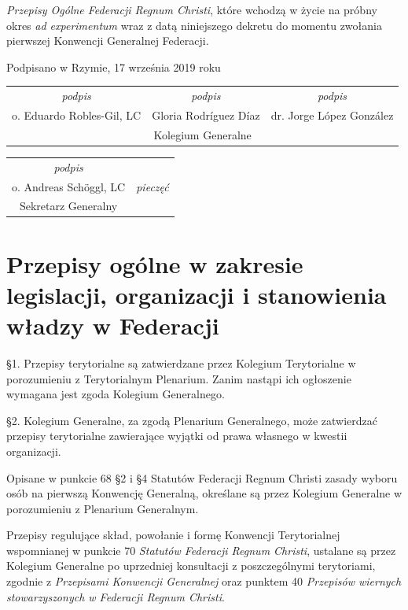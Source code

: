 \begin{framed}
\begin{footnotesize}
		{\em Przepisy Ogólne Federacji Regnum Christi}, które wchodzą w życie na próbny okres {\em ad experimentum} wraz z datą niniejszego dekretu do momentu zwołania pierwszej Konwencji Generalnej Federacji.
		\begin{center}
			Podpisano w Rzymie, 17 września 2019 roku
			\begin{tabular}
				{ c c c } {\em podpis} & {\em podpis} & {\em podpis} \\
				o. Eduardo Robles-Gil, LC & Gloria Rodríguez Díaz & dr. Jorge López González \\
				\multicolumn{3}{c}{Kolegium Generalne} 
			\end{tabular}
			\begin{tabular}
				{ c c } {\em podpis} & \\
				o. Andreas Schöggl, LC & {\em pieczęć} \\
				Sekretarz Generalny & 
			\end{tabular}
		\end{center}
	\end{footnotesize}
\end{framed}

\setlength{
\parskip}{1em}

\chapter{Przepisy ogólne w zakresie legislacji, organizacji i stanowienia władzy w Federacji}


 \S{}1. Przepisy terytorialne są zatwierdzane przez Kolegium Terytorialne w porozumieniu z Terytorialnym Plenarium. Zanim nastąpi ich ogłoszenie wymagana jest zgoda Kolegium Generalnego.

\S{}2. Kolegium Generalne, za zgodą Plenarium Generalnego, może zatwierdzać przepisy terytorialne zawierające wyjątki od prawa własnego w kwestii organizacji.


 Opisane w punkcie 68 \S{}2 i \S{}4 Statutów Federacji Regnum Christi zasady wyboru osób na pierwszą Konwencję Generalną, określane są przez Kolegium Generalne w porozumieniu z Plenarium Generalnym.


 Przepisy regulujące skład, powołanie i formę Konwencji Terytorialnej wspomnianej w punkcie 70 {\em Statutów Federacji Regnum Christi}, ustalane są przez Kolegium Generalne po uprzedniej konsultacji z poszczególnymi terytoriami, zgodnie z {\em Przepisami Konwencji Generalnej} oraz punktem 40 {\em Przepisów wiernych stowarzyszonych w Federacji Regnum Christi}.

